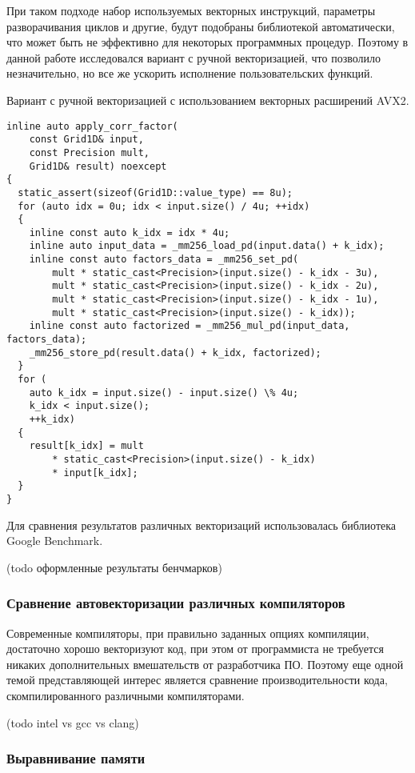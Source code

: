При таком подходе набор используемых векторных инструкций, параметры разворачивания циклов и другие, будут подобраны библиотекой автоматически,
что может быть не эффективно для некоторых программных процедур. Поэтому в данной работе исследовался вариант с ручной векторизацией,
что позволило незначительно, но все же ускорить исполнение пользовательских функций.

Вариант с ручной векторизацией с использованием векторных расширений AVX2.

\begin{lstlisting}[style={CppCodeStyle}]
inline auto apply_corr_factor(
	const Grid1D& input,
	const Precision mult,
	Grid1D& result) noexcept
{
  static_assert(sizeof(Grid1D::value_type) == 8u);
  for (auto idx = 0u; idx < input.size() / 4u; ++idx)
  {
    inline const auto k_idx = idx * 4u;
    inline auto input_data = _mm256_load_pd(input.data() + k_idx);
    inline const auto factors_data = _mm256_set_pd(
        mult * static_cast<Precision>(input.size() - k_idx - 3u),
        mult * static_cast<Precision>(input.size() - k_idx - 2u),
        mult * static_cast<Precision>(input.size() - k_idx - 1u),
        mult * static_cast<Precision>(input.size() - k_idx));
    inline const auto factorized = _mm256_mul_pd(input_data, factors_data);
    _mm256_store_pd(result.data() + k_idx, factorized);
  }
  for (
  	auto k_idx = input.size() - input.size() \% 4u;
  	k_idx < input.size();
  	++k_idx) 
  {
    result[k_idx] = mult
    	* static_cast<Precision>(input.size() - k_idx)
    	* input[k_idx];
  }
}
\end{lstlisting}

Для сравнения результатов различных векторизаций использовалась библиотека Google Benchmark.

(todo оформленные результаты бенчмарков)

\subsubsection{Сравнение автовекторизации различных компиляторов}

Современные компиляторы, при правильно заданных опциях компиляции, достаточно хорошо векторизуют код,
при этом от программиста не требуется никаких дополнительных вмешательств от разработчика ПО.
Поэтому еще одной темой представляющей интерес является сравнение производительности кода,
скомпилированного различными компиляторами.

(todo intel vs gcc vs clang)

\subsubsection{Выравнивание памяти}


